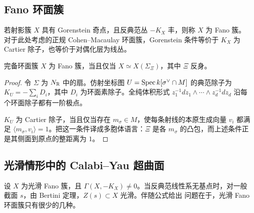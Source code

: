 \subsection{Fano 环面簇}
\begin{definition}\label{def:5.2}
若射影簇 $X$ 具有 Gorenstein 奇点，且反典范丛 $-K_X$ 丰，则称 $X$ 为 Fano 簇。对于此处考虑的正规 Cohen–Macaulay 环面簇，Gorenstein 条件等价于 $K_X$ 为 Cartier 除子，也等价于对偶化层为线丛。
\end{definition}
\begin{proposition}\label{prop:5.1}
完备环面簇 $X$ 为 Fano 簇，当且仅当 $X\simeq X(\Sigma_\Xi)$，其中 $\Xi$ 反身。
\end{proposition}
\begin{proof}
令 $\Sigma$ 为 $N_{\mathbb R}$ 中的扇。仿射坐标图 $U=\operatorname{Spec} k[\sigma^\vee\cap M]$ 的典范除子为 $K_U=-\sum_iD_i$，其中 $D_i$ 为环面素除子。全纯体积形式 $z_1^{-1}dz_1\wedge\cdots\wedge z_d^{-1}dz_d$ 沿每个环面除子都有一阶极点。

$K_U$ 为 Cartier 除子，当且仅当存在 $m_\sigma\in M$，使每条射线的本原生成向量 $v_i$ 都满足 $\langle m_\sigma,v_i\rangle=1$。把这一条件译成多胞体语言：$\Xi$ 是各 $m_\sigma$ 的凸包，而上述条件正是其侧面到原点的整距离为 $1$。
\end{proof}
\subsection{光滑情形中的 Calabi–Yau 超曲面}
设 $X$ 为光滑 Fano 簇，且 $\Gamma(X,-K_X)\ne0$。当反典范线性系无基点时，对一般截面 $s$，由 Bertini 定理，$Z(s)\subset X$ 光滑。伴随公式给出
问题在于，光滑 Fano 环面簇只有很少的几种。
